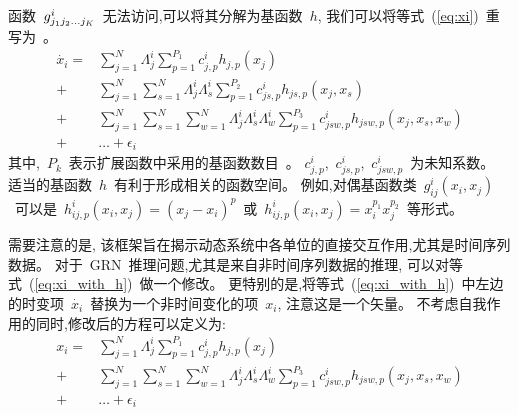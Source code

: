函数~$g^i_{j_{1}j_{2}\ldots\\j_{K}}$~无法访问,可以将其分解为基函数~$h$,
我们可以将等式~(\ref{eq:xi})~重写为~\cite{casadiego2017model}。
\begin{equation}
\label{eq:xi_with_h}
\begin{split}
\dot{x_i} =  &\sum_{j=1}^{N} \Lambda^i_{j} \sum_{p=1}^{P_1} c^i_{j,p}h_{j,p}(x_j) \\
+ &  \sum_{j=1}^{N} \sum_{s=1}^{N}\Lambda^i_{j}\Lambda^i_{s} \sum_{p=1}^{P_2} c^i_{js,p}h_{js,p}(x_j,x_s) \\
                             + &\sum_{j=1}^{N} \sum_{s=1}^{N} \sum_{w=1}^{N}\Lambda^i_{j}\Lambda^i_{s}\Lambda^i_{w} \sum_{p=1}^{P_3} c^i_{jsw,p}h_{jsw,p}(x_j,x_s,x_w)\\
                             + &\ldots + \epsilon_{i} 
\end{split}
\end{equation}
其中,~$P_k$~表示扩展函数中采用的基函数数目~\cite{friedman2001elements}。
$c^i_{j,p}$,~$c^i_{js,p}$,~$c^i_{jsw,p}$~为未知系数。
适当的基函数~$h$~有利于形成相关的函数空间。
例如,对偶基函数类~$g^i_{ij}(x_i,x_j)$~可以是~$h^i_{ij,p}(x_i,x_j)=(x_j-x_i)^p$~或~$h^i_{ij,p}(x_i,x_j)=x^{p_{1}}_i x^{p_{2}}_j$~等形式。


需要注意的是, 该框架旨在揭示动态系统中各单位的直接交互作用,尤其是时间序列数据。
对于~GRN~推理问题,尤其是来自非时间序列数据的推理,
可以对等式~(\ref{eq:xi_with_h})~做一个修改。
更特别的是,将等式~(\ref{eq:xi_with_h})~中左边的时变项~$\dot{x_i}$~替换为一个非时间变化的项~$x_i$, 注意这是一个矢量。
不考虑自我作用的同时,修改后的方程可以定义为:
\begin{equation}
\label{eq:x_i_fs}
\begin{split}
   x_i = &\sum_{j=1}^{N} \Lambda^i_{j} \sum_{p=1}^{P_1} c^i_{j,p}h_{j,p}(x_j)\\  
       + &\sum_{j=1}^{N} \sum_{s=1}^{N} \sum_{w=1}^{N}\Lambda^i_{j}\Lambda^i_{s}\Lambda^i_{w} \sum_{p=1}^{P_3} c^i_{jsw,p}h_{jsw,p}(x_j,x_s,x_w)\\
       +&\ldots + \epsilon_{i}
   \end{split}
\end{equation}

